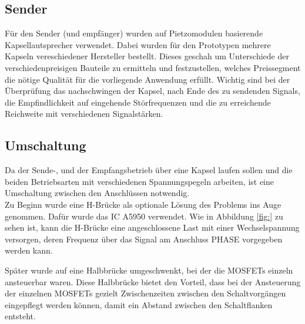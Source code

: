 \subsection{Sender}
Für den Sender (und empfänger) wurden auf Pietzomodulen basierende Kapsellautsprecher verwendet. Dabei wurden für den Prototypen mehrere Kapseln vereschiedener Hersteller bestellt. Dieses geschah um Unterschiede der verschiedenpreisigen Bauteile zu ermitteln und festzustellen, welches Preissegment die nötige Qualität für die vorliegende Anwendung erfüllt. Wichtig sind bei der Überprüfung das nachschwingen der Kapsel, nach Ende des zu sendenden Signals, die Empfindlichkeit auf eingehende Störfrequenzen und die zu erreichende Reichweite mit verschiedenen Signalstärken.

\subsection{Umschaltung}
Da der Sende-, und der Empfangsbetrieb über eine Kapsel laufen sollen und die beiden Betriebsarten mit verschiedenen Spannungspegeln arbeiten, ist eine Umschaltung zwischen den Anschlüssen notwendig.\\
Zu Beginn wurde eine H-Brücke als optionale Lösung des Problems ins Auge genommen. Dafür wurde das IC A5950 verwendet. Wie in Abbildung \ref{fig:} zu sehen ist, kann die H-Brücke eine angeschlossene Last mit einer Wechselspannung versorgen, deren Frequenz über das Signal am Anschluss PHASE vorgegeben werden kann.

Später wurde auf eine Halbbrücke umgeschwenkt, bei der die MOSFETs einzeln ansteuerbar waren. Diese Halbbrücke bietet den Vorteil, dass bei der Ansteuerung der einzelnen MOSFETs gezielt Zwischenzeiten zwischen den Schaltvorgängen eingepflegt werden können, damit ein Abstand zwischen den Schaltflanken entsteht.

